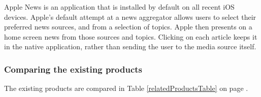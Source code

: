 \documentclass[12pt]{article}
\begin{document}
Apple News\cite{appleNews} is an application that is installed by default on all recent iOS devices. Apple's default attempt at a news aggregator allows users to select their preferred news sources, and from a selection of topics. Apple\cite{apple} then presents on a home screen news from those sources and topics. Clicking on each article keeps it in the native application, rather than sending the user to the media source itself.

\subsubsection{Comparing the existing products}

The existing products are compared in Table \ref{relatedProductsTable} on page \pageref{relatedProductsTable}.
\end{document}
